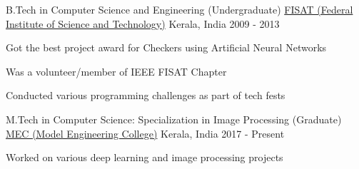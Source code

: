 \newpage
{}
\begin{cventries}
  \cventry
    {B.Tech in Computer Science and Engineering (Undergraduate)}
    {\href{http://fisat.ac.in/}{FISAT (Federal Institute of Science and Technology)}}
    {Kerala, India}
    {2009 - 2013}
    {
      \begin{cvitems}
        \item {Got the best project award for Checkers using Artificial Neural Networks}
        \item {Was a volunteer/member of IEEE FISAT Chapter}
        \item {Conducted various programming challenges as part of tech fests}
      \end{cvitems}
    }
  \cventry
    {M.Tech in Computer Science: Specialization in Image Processing (Graduate)}
    {\href{http://www.mec.ac.in/}{MEC (Model Engineering College)}}
    {Kerala, India}
    {2017 - Present}
    {
      \begin{cvitems}
        \item {Worked on various deep learning and image processing projects}
      \end{cvitems}
    }
\end{cventries}
